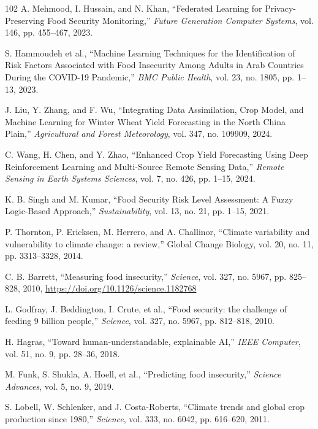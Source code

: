 \documentclass[preprint,12pt]{elsarticle}
\begin{document}
\begin{thebibliography}{102}
		A. Mehmood, I. Hussain, and N. Khan, ``Federated Learning for Privacy-Preserving Food Security Monitoring,'' \emph{Future Generation Computer Systems}, vol. 146, pp. 455--467, 2023.
		
		S. Hammoudeh et al., ``Machine Learning Techniques for the Identification of Risk Factors Associated with Food Insecurity Among Adults in Arab Countries During the COVID-19 Pandemic,'' \emph{BMC Public Health}, vol. 23, no. 1805, pp. 1--13, 2023.
		
		J. Liu, Y. Zhang, and F. Wu, ``Integrating Data Assimilation, Crop Model, and Machine Learning for Winter Wheat Yield Forecasting in the North China Plain,'' \emph{Agricultural and Forest Meteorology}, vol. 347, no. 109909, 2024.
		
		C. Wang, H. Chen, and Y. Zhao, ``Enhanced Crop Yield Forecasting Using Deep Reinforcement Learning and Multi-Source Remote Sensing Data,'' \emph{Remote Sensing in Earth Systems Sciences}, vol. 7, no. 426, pp. 1--15, 2024.
		
		K. B. Singh and M. Kumar, ``Food Security Risk Level Assessment: A Fuzzy Logic-Based Approach,'' \emph{Sustainability}, vol. 13, no. 21, pp. 1--15, 2021.
		
		P. Thornton, P. Ericksen, M. Herrero, and A. Challinor, ``Climate variability and vulnerability to climate change: a review,'' Global Change Biology, vol. 20, no. 11, pp. 3313--3328, 2014.
		
		C. B. Barrett, ``Measuring food insecurity,'' \emph{Science}, vol. 327, no. 5967, pp. 825--828, 2010, \url{https://doi.org/10.1126/science.1182768}
		
		L. Godfray, J. Beddington, I. Crute, et al., ``Food security: the challenge of feeding 9 billion people,'' \emph{Science}, vol. 327, no. 5967, pp. 812--818, 2010.
		
		H. Hagras, ``Toward human-understandable, explainable AI,'' \emph{IEEE Computer}, vol. 51, no. 9, pp. 28--36, 2018.
		
		M. Funk, S. Shukla, A. Hoell, et al., ``Predicting food insecurity,'' \emph{Science Advances}, vol. 5, no. 9, 2019.
		
		S. Lobell, W. Schlenker, and J. Costa-Roberts, ``Climate trends and global crop production since 1980,'' \emph{Science}, vol. 333, no. 6042, pp. 616--620, 2011.
		

\end{thebibliography}
\end{document}
